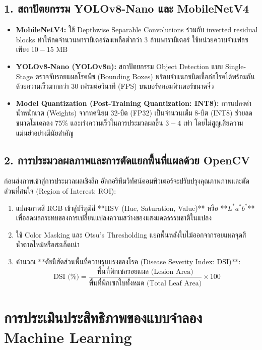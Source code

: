 \subsection{1. สถาปัตยกรรม YOLOv8-Nano และ MobileNetV4}
\begin{itemize}
    \item \textbf{MobileNetV4:} ใช้ Depthwise Separable Convolutions ร่วมกับ inverted residual blocks ทำให้ลดจำนวนพารามิเตอร์ลงเหลือต่ำกว่า 3 ล้านพารามิเตอร์ ใช้หน่วยความจำแฟลชเพียง $10 - 15\text{ MB}$
    \item \textbf{YOLOv8-Nano (YOLOv8n):} สถาปัตยกรรม Object Detection แบบ Single-Stage ตรวจจับรอยแผลโรคพืช (Bounding Boxes) พร้อมจำแนกชนิดเชื้อก่อโรคได้พร้อมกัน ด้วยความเร็วมากกว่า 30 เฟรมต่อวินาที (FPS) บนบอร์ดคอมพิวเตอร์ขนาดจิ๋ว
    \item \textbf{Model Quantization (Post-Training Quantization: INT8):} การแปลงค่าน้ำหนักเวต (Weights) จากทศนิยม 32-บิต (FP32) เป็นจำนวนเต็ม 8-บิต (INT8) ช่วยลดขนาดโมเดลลง $75\%$ และเร่งความเร็วในการประมวลผลขึ้น $3 - 4$ เท่า โดยไม่สูญเสียความแม่นยำอย่างมีนัยสำคัญ
\end{itemize}

\subsection{2. การประมวลผลภาพและการตัดแยกพื้นที่แผลด้วย OpenCV}
ก่อนส่งภาพเข้าสู่การประมวลผลเชิงลึก อัลกอริทึมวิทัศน์คอมพิวเตอร์จะปรับปรุงคุณภาพภาพและตัดส่วนที่สนใจ (Region of Interest: ROI):
\begin{enumerate}
    \item แปลงภาพสี RGB เข้าสู่ปริภูมิสี **HSV (Hue, Saturation, Value)** หรือ **$L^*a^*b^*$** เพื่อลดผลกระทบของการเปลี่ยนแปลงความสว่างของแสงแดดธรรมชาติในแปลง
    \item ใช้ Color Masking และ Otsu's Thresholding แยกพื้นหลังใบไม้ออกจากรอยแผลจุดสีน้ำตาลไหม้หรือสะเก็ดเน่า
    \item คำนวณ **ดัชนีสัดส่วนพื้นที่ความรุนแรงของโรค (Disease Severity Index: DSI)**:
    \begin{equation}
    \text{DSI (\%)} = \frac{\text{พื้นที่พิกเซลรอยแผล (Lesion Area)}}{\text{พื้นที่พิกเซลใบทั้งหมด (Total Leaf Area)}} \times 100
    \end{equation}
\end{enumerate}

\section{การประเมินประสิทธิภาพของแบบจำลอง Machine Learning}

